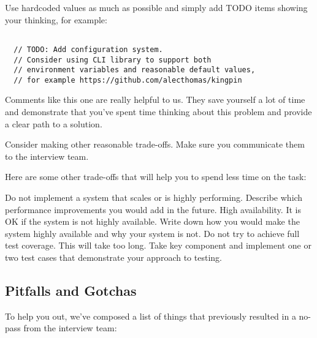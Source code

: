 \documentclass{article}
\begin{document}
Use hardcoded values as much as possible and simply add TODO items showing your thinking, for example:

\begin{lstlisting}[caption=TODO example]
  
  // TODO: Add configuration system.
  // Consider using CLI library to support both
  // environment variables and reasonable default values,
  // for example https://github.com/alecthomas/kingpin

\end{lstlisting}

Comments like this one are really helpful to us.
They save yourself a lot of time and demonstrate that you've spent time thinking about this problem and provide a clear path to a solution.

Consider making other reasonable trade-offs. Make sure you communicate them to the interview team.

Here are some other trade-offs that will help you to spend less time on the task:

Do not implement a system that scales or is highly performing. Describe which performance improvements you would add in the future.
High availability. It is OK if the system is not highly available. Write down how you would make the system highly available and why your system is not.
Do not try to achieve full test coverage. This will take too long. Take key component and implement one or two test cases that demonstrate your approach to testing.

\subsection{Pitfalls and Gotchas}
    
  To help you out, we've composed a list of things that previously resulted in a no-pass from the interview team:
\end{document}
